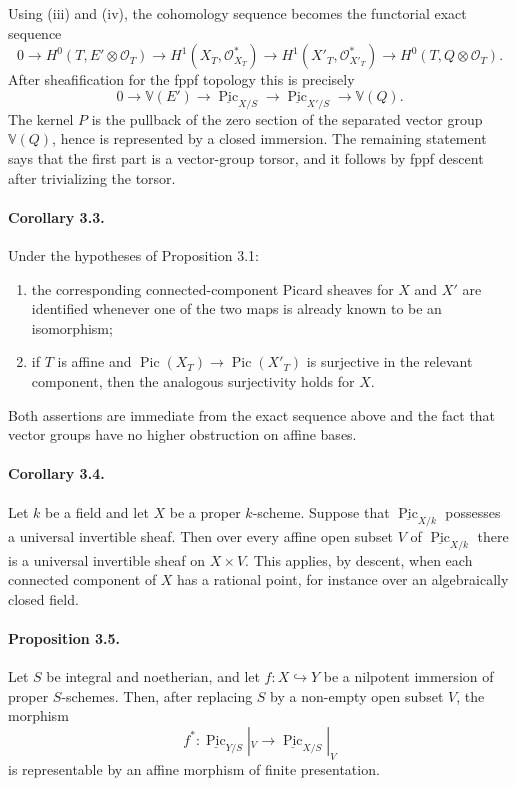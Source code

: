 \documentclass[12pt]{article}
\newcommand{\cO}{\mathcal O}
\newcommand{\Pic}{\operatorname{Pic}}
\begin{document}
Using (iii) and (iv), the cohomology sequence becomes the functorial exact sequence
\[
0\to H^0(T,E'\otimes\cO_T)\to
H^1(X_T,\cO_{X_T}^*)\to
H^1(X'_T,\cO_{X'_T}^*)\to
H^0(T,Q\otimes\cO_T).
\]
After sheafification for the fppf topology this is precisely
\[
0\to\mathbb V(E')\to\underline{\Pic}_{X/S}\to
\underline{\Pic}_{X'/S}\to\mathbb V(Q).
\]
The kernel $P$ is the pullback of the zero section of the separated vector group $\mathbb V(Q)$, hence is represented by a closed immersion. The remaining statement says that the first part is a vector-group torsor, and it follows by fppf descent after trivializing the torsor.

\paragraph{Corollary 3.3.}
Under the hypotheses of Proposition 3.1:
\begin{enumerate}[label=\roman*)]
\item the corresponding connected-component Picard sheaves for $X$ and $X'$ are identified whenever one of the two maps is already known to be an isomorphism;
\item if $T$ is affine and $\Pic(X_T)\to \Pic(X'_T)$ is surjective in the relevant component, then the analogous surjectivity holds for $X$.
\end{enumerate}
Both assertions are immediate from the exact sequence above and the fact that vector groups have no higher obstruction on affine bases.

\paragraph{Corollary 3.4.}
Let $k$ be a field and let $X$ be a proper $k$-scheme. Suppose that $\underline{\Pic}_{X/k}$ possesses a universal invertible sheaf. Then over every affine open subset $V$ of $\underline{\Pic}_{X/k}$ there is a universal invertible sheaf on $X\times V$. This applies, by descent, when each connected component of $X$ has a rational point, for instance over an algebraically closed field.

\paragraph{Proposition 3.5.}
Let $S$ be integral and noetherian, and let $f:X\hookrightarrow Y$ be a nilpotent immersion of proper $S$-schemes. Then, after replacing $S$ by a non-empty open subset $V$, the morphism
\[
f^*:\underline{\Pic}_{Y/S}|_V\to\underline{\Pic}_{X/S}|_V
\]
is representable by an affine morphism of finite presentation.
\end{document}
